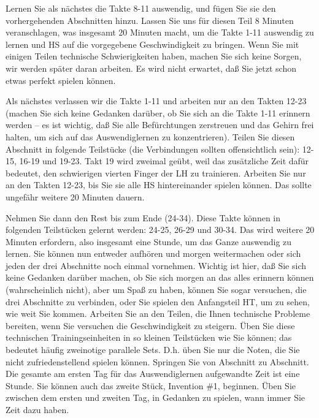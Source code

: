 Lernen Sie als nächstes die Takte 8-11 auswendig, und fügen Sie sie den vorhergehenden Abschnitten hinzu.
Lassen Sie uns für diesen Teil 8 Minuten veranschlagen, was insgesamt 20 Minuten macht, um die Takte 1-11 auswendig zu lernen und HS auf die vorgegebene Geschwindigkeit zu bringen.
Wenn Sie mit einigen Teilen technische Schwierigkeiten haben, machen Sie sich keine Sorgen, wir werden später daran arbeiten.
Es wird nicht erwartet, daß Sie jetzt schon etwas perfekt spielen können.

Als nächstes verlassen wir die Takte 1-11 und arbeiten nur an den Takten 12-23 (machen Sie sich keine Gedanken darüber, ob Sie sich an die Takte 1-11 erinnern werden -- es ist wichtig, daß Sie alle Befürchtungen zerstreuen und das Gehirn frei halten, um sich auf das Auswendiglernen zu konzentrieren).
Teilen Sie diesen Abschnitt in folgende Teilstücke (die Verbindungen sollten offensichtlich sein): 12-15, 16-19 und 19-23.
Takt 19 wird zweimal geübt, weil das zusätzliche Zeit dafür bedeutet, den schwierigen vierten Finger der LH zu trainieren.
Arbeiten Sie nur an den Takten 12-23, bis Sie sie alle HS hintereinander spielen können.
Das sollte ungefähr weitere 20 Minuten dauern.

Nehmen Sie dann den Rest bis zum Ende (24-34).
Diese Takte können in folgenden Teilstücken gelernt werden: 24-25, 26-29 und 30-34.
Das wird weitere 20 Minuten erfordern, also insgesamt eine Stunde, um das Ganze auswendig zu lernen.
Sie können nun entweder aufhören und morgen weitermachen oder sich jeden der drei Abschnitte noch einmal vornehmen.
Wichtig ist hier, daß Sie sich keine Gedanken darüber machen, ob Sie sich morgen an das alles erinnern können (wahrscheinlich nicht), aber um Spaß zu haben, können Sie sogar versuchen, die drei Abschnitte zu verbinden, oder Sie spielen den Anfangsteil HT, um zu sehen, wie weit Sie kommen.
Arbeiten Sie an den Teilen, die Ihnen technische Probleme bereiten, wenn Sie versuchen die Geschwindigkeit zu steigern.
Üben Sie diese technischen Trainingseinheiten in so kleinen Teilstücken wie Sie können; das bedeutet häufig zweinotige parallele Sets.
D.h. üben Sie nur die Noten, die Sie nicht zufriedenstellend spielen können.
Springen Sie von Abschnitt zu Abschnitt.
Die gesamte am ersten Tag für das Auswendiglernen aufgewandte Zeit ist eine Stunde.
Sie können auch das zweite Stück, Invention \#1, beginnen.
Üben Sie zwischen dem ersten und zweiten Tag, in Gedanken zu spielen, wann immer Sie Zeit dazu haben.

